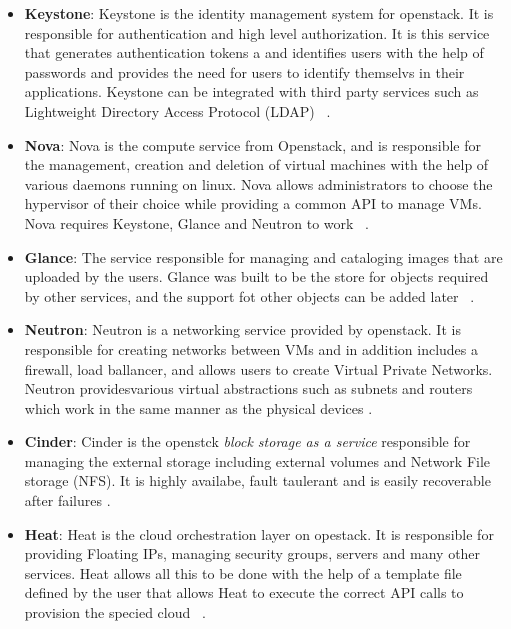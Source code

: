 \begin{itemize}
\item \textbf{Keystone}: Keystone is the identity management system for
openstack. It is responsible for authentication and high level
authorization.  It is this service that generates authentication
tokens a and identifies users with the help of passwords and provides
the need for users to identify themselvs in their
applications. Keystone can be integrated with third party services
such as Lightweight Directory Access Protocol
(LDAP)~\cite{hid-sp18-503-oracle-openstack}
\cite{hid-sp18-503-keystone}.

\item \textbf{Nova}: Nova is the compute service from Openstack, and is
responsible for the management, creation and deletion of virtual
machines with the help of various daemons running on linux.  Nova
allows administrators to choose the hypervisor of their choice while
providing a common API to manage VMs. Nova requires Keystone, Glance
and Neutron to work~\cite{hid-sp18-503-oracle-openstack}
\cite{hid-sp18-503-nova}.

\item \textbf{Glance}: The service responsible for managing and cataloging
images that are uploaded by the users. Glance was built to be the
store for objects required by other services, and the support fot
other objects can be added later~\cite{hid-sp18-503-oracle-openstack}
\cite{hid-sp18-503-glance}.

\item \textbf{Neutron}: Neutron is a networking service provided by openstack.
It is responsible for creating networks between VMs and in addition
includes a firewall, load ballancer, and allows users to create
Virtual Private Networks.  Neutron providesvarious virtual
abstractions such as subnets and routers which work in the same manner
as the physical devices
\cite{hid-sp18-503-oracle-openstack}
\cite{hid-sp18-503-neutron}.

\item \textbf{Cinder}: Cinder is the openstck \emph{block storage as a service}
responsible for managing the external storage including external
volumes and Network File storage (NFS). It is highly availabe, fault
taulerant and is easily recoverable after failures
\cite{hid-sp18-503-cinder}.

\item \textbf{Heat}: Heat is the cloud orchestration layer on opestack. It
is responsible for providing Floating IPs, managing security groups,
servers and many other services. Heat allows all this to be done with
the help of a template file defined by the user that allows Heat to
execute the correct API calls to provision the specied
cloud~\cite{hid-sp18-503-oracle-openstack}
\cite{hid-sp18-503-heat}.


\end{itemize}
